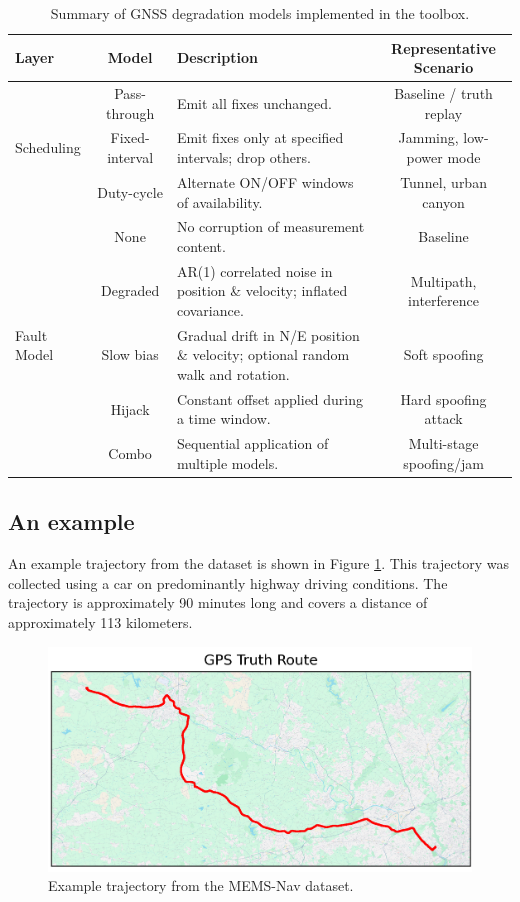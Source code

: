 \documentclass[Afour,sageh,times]{sagej}
\begin{document}
\begin{table}
\centering
\caption{Summary of GNSS degradation models implemented in the toolbox.}
\begin{tabular}{|l|c|p{6cm}|c|}
\hline
\textbf{Layer} & \textbf{Model} & \textbf{Description} & \textbf{Representative Scenario} \\
\hline
\multirow{3}{*}{Scheduling} 
  & Pass-through   & Emit all fixes unchanged. & Baseline / truth replay \\
  & Fixed-interval & Emit fixes only at specified intervals; drop others. & Jamming, low-power mode \\
  & Duty-cycle     & Alternate ON/OFF windows of availability. & Tunnel, urban canyon \\
\hline
\multirow{5}{*}{Fault Model}
  & None           & No corruption of measurement content. & Baseline \\
  & Degraded       & AR(1) correlated noise in position \& velocity; inflated covariance. & Multipath, interference \\
  & Slow bias      & Gradual drift in N/E position \& velocity; optional random walk and rotation. & Soft spoofing \\
  & Hijack         & Constant offset applied during a time window. & Hard spoofing attack \\
  & Combo          & Sequential application of multiple models. & Multi-stage spoofing/jam \\
\hline
\end{tabular}
\end{table}

\subsection{An example}

An example trajectory from the dataset is shown in Figure \ref{fig:example_trajectory}. This trajectory was collected using a car on predominantly highway driving conditions. The trajectory is approximately 90 minutes long and covers a distance of approximately 113 kilometers. 

\begin{figure}
  \centering
  \includegraphics[width=\textwidth]{images/route_gps.png}  
  \caption{Example trajectory from the MEMS-Nav dataset.}
  \label{fig:example_trajectory}
\end{figure}
\end{document}
